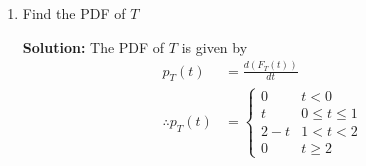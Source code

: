 \documentclass[journal,12pt,twocolumn]{IEEEtran}
\newcommand{\solution}{\noindent \textbf{Solution: }}
\numberwithin{equation}{section}
\renewcommand\thesection{\arabic{section}}
\begin{document}
\begin{enumerate}[label=\thesection.\arabic*,ref=\thesection.\theenumi]
\begin{enumerate}[label=\thesection.\arabic*,ref=\thesection.\theenumi]
	\solution \begin{align}
    p_T(x) &= p_{U_1 + U_2}(x) = p_{U_1}(x) * p_{U_2}(x)\\
    p_T(x) &= \int_{-\infty}^{\infty}p_{U_1}(\tau)p_{U_2}(x - \tau)\\
    p_T(x) &= \int_0^1p_{U_2}(x - \tau)
\end{align}
\begin{align}
    \displaystyle p_T(x) = \begin{cases} 
    0 & \text{$x \leq 0$} \\  
    \int_0^x 1d\tau & \text{$0 < x < 1$} \\  
    \int_{x - 1}^1 1d\tau & \text{$1 \leq x < 2$} \\
    0 & \text{$x > 2$}
    \end{cases}
\end{align}
\begin{align}
    \displaystyle p_T(x) = \begin{cases} 
    0 & \text{$x \leq 0$} \\  
    x & \text{$0 < x < 1$} \\  
    2 - x & \text{$1 \leq x < 2$} \\
    0 & \text{$x > 2$}
    \end{cases}
\end{align}
Expression for CDF can be obtained by integrating $p_T(x)$ w.r.t. $X$
\begin{align}
    \displaystyle F_T(x) = \begin{cases} 
    0 & \text{$x \leq 0$} \\  
    \frac{x^2}{2} & \text{$0 < x < 1$} \\  
    -\frac{x^2}{2} + 2x - 1 & \text{$1 \leq x < 2$} \\
    1 & \text{$x > 2$}
    \end{cases}
\end{align}
	
	\item Find the PDF of $T$
	
	\solution The PDF of $T$ is given by
	\begin{align}
		p_T(t) &= \frac{d(F_{T}(t))}{dt} \\
		\therefore p_T(t) &=
		\begin{cases}
			0 & t < 0 \\
			t & 0 \le t \le 1 \\
			2 - t & 1 < t < 2 \\
			0 & t \ge 2
		\end{cases}
	\end{align}
	

\end{enumerate}
\end{enumerate}
\end{document}
